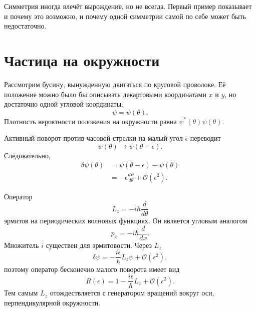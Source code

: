 Симметрия иногда влечёт вырождение, но не всегда. Первый пример показывает и почему это возможно, и почему одной симметрии самой по себе может быть недостаточно.

\section{Частица на окружности}

Рассмотрим бусину, вынужденную двигаться по круговой проволоке. Её положение можно было бы описывать декартовыми координатами \(x\) и \(y\), но достаточно одной угловой координаты:
\begin{equation}
\psi=\psi(\theta).
\end{equation}
Плотность вероятности положения на окружности равна \(\psi^*(\theta)\psi(\theta)\).

Активный поворот против часовой стрелки на малый угол \(\epsilon\) переводит
\begin{equation}
\psi(\theta)\longrightarrow\psi(\theta-\epsilon).
\end{equation}
Следовательно,
\begin{align}
\delta\psi(\theta)
&=\psi(\theta-\epsilon)-\psi(\theta)\\
&=-\epsilon\frac{d\psi}{d\theta}
+\mathcal O(\epsilon^2).
\end{align}

Оператор
\begin{equation}
L_z=-i\hbar\frac{d}{d\theta}
\end{equation}
эрмитов на периодических волновых функциях. Он является угловым аналогом
\begin{equation}
p_x=-i\hbar\frac{d}{dx}.
\end{equation}
Множитель \(i\) существен для эрмитовости. Через \(L_z\)
\begin{equation}
\delta\psi
=-\frac{i\epsilon}{\hbar}L_z\psi
+\mathcal O(\epsilon^2),
\end{equation}
поэтому оператор бесконечно малого поворота имеет вид
\begin{equation}
R(\epsilon)
=1-\frac{i\epsilon}{\hbar}L_z
+\mathcal O(\epsilon^2).
\end{equation}
Тем самым \(L_z\) отождествляется с генератором вращений вокруг оси, перпендикулярной окружности.

\begin{classroomqa}
\end{classroomqa}


